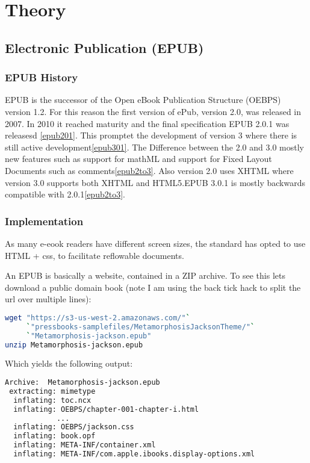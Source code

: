 \documentclass[]{report}   %
\begin{document}
\chapter{Theory}
\section{Electronic Publication (EPUB)}
\subsection{EPUB History}
EPUB is the successor of the Open eBook Publication Structure (OEBPS) version
1.2. For this reason the first version of ePub, version 2.0, was released in
2007. In 2010 it reached maturity and the final specification EPUB 2.0.1 was
releasesd \ref{epub201}. This promptet the development of version 3 where there
is still active development\ref{epub301}. The Difference between the 2.0 and
3.0 mostly new features such as support for mathML and support for Fixed Layout Documents such as comments\ref{epub2to3}. Also version 2.0 uses XHTML where version 3.0 supports both XHTML and HTML5.EPUB 3.0.1 is mostly backwards compatible with 2.0.1\ref{epub2to3}. 

\subsection{Implementation}
As many e-eook readers have different screen sizes, the standard has opted to
use HTML + css, to facilitate reflowable documents.

An EPUB is basically a website, contained in a ZIP archive. To see this lets download a public domain book (note I am using the back tick hack to split the url over multiple lines):

\begin{lstlisting}[language=bash]
wget "https://s3-us-west-2.amazonaws.com/"`
     `"pressbooks-samplefiles/MetamorphosisJacksonTheme/"`
     `"Metamorphosis-jackson.epub"
unzip Metamorphosis-jackson.epub
\end{lstlisting}

Which yields the following output:

\begin{lstlisting}[language=bash]
Archive:  Metamorphosis-jackson.epub
 extracting: mimetype
  inflating: toc.ncx
  inflating: OEBPS/chapter-001-chapter-i.html
            ...
  inflating: OEBPS/jackson.css
  inflating: book.opf
  inflating: META-INF/container.xml
  inflating: META-INF/com.apple.ibooks.display-options.xml
\end{lstlisting}
\end{document}
